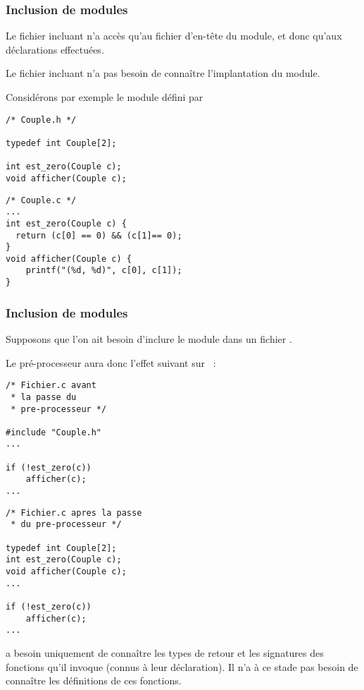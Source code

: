 \begin{frame}[fragile]
\frametitle{Inclusion de modules}
Le fichier incluant n'a \alert{accès} qu'au fichier d'en-tête du module,
et donc qu'aux \alert{déclarations effectuées}.
\medskip

Le fichier incluant n'a pas besoin de connaître l'implantation du module.
\bigskip

Considérons par exemple le module  défini par
\medskip

\begin{minipage}[c]{.38\textwidth}
\begin{lstlisting}[frame=single,numbers=none]
/* Couple.h */

typedef int Couple[2];

int est_zero(Couple c);
void afficher(Couple c);
\end{lstlisting}
\end{minipage}
\quad
\begin{minipage}[c]{.55\textwidth}
\begin{lstlisting}[frame=single,numbers=none]
/* Couple.c */
...
int est_zero(Couple c) {
  return (c[0] == 0) && (c[1]== 0);
}
void afficher(Couple c) {
    printf("(%d, %d)", c[0], c[1]);
}
\end{lstlisting}
\end{minipage}
\end{frame}

\begin{frame}[fragile]
\frametitle{Inclusion de modules}
Supposons que l'on ait besoin d'inclure le module  dans un
fichier .
\medskip

Le pré-processeur aura donc l'effet suivant sur ~:
\medskip

\begin{minipage}[c]{.3\textwidth}
\begin{lstlisting}[frame=single,numbers=none]
/* Fichier.c avant
 * la passe du
 * pre-processeur */

#include "Couple.h"
...

if (!est_zero(c))
    afficher(c);
...
\end{lstlisting}
\end{minipage}
\qquad \qquad
\begin{minipage}[c]{.4\textwidth}
\begin{lstlisting}[frame=single,numbers=none]
/* Fichier.c apres la passe
 * du pre-processeur */

typedef int Couple[2];
int est_zero(Couple c);
void afficher(Couple c);
...

if (!est_zero(c))
    afficher(c);
...
\end{lstlisting}
\end{minipage}
\medskip

 a besoin uniquement de connaître les types de retour et
les signatures des fonctions qu'il invoque (connus à leur déclaration).
Il n'a à ce stade pas besoin de connaître les définitions de ces fonctions.
\end{frame}

